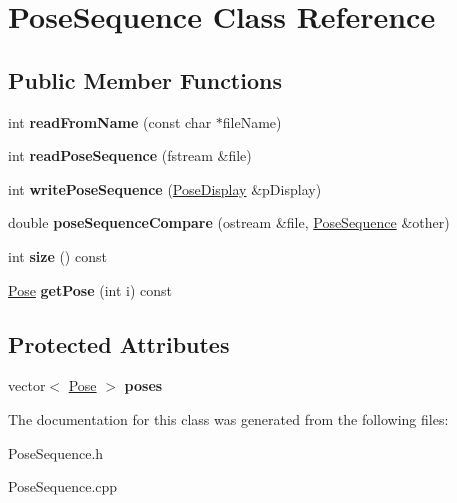 \hypertarget{classPoseSequence}{}\section{Pose\+Sequence Class Reference}
\label{classPoseSequence}
\subsection*{Public Member Functions}
\begin{DoxyCompactItemize}
\item 
\hypertarget{classPoseSequence_a86f364410d68c0fbdb44671702d691ef}{}int {\bfseries read\+From\+Name} (const char $\ast$file\+Name)\label{classPoseSequence_a86f364410d68c0fbdb44671702d691ef}

\item 
\hypertarget{classPoseSequence_a9c572d095fd38ab1eb5a366c5a5a849f}{}int {\bfseries read\+Pose\+Sequence} (fstream \&file)\label{classPoseSequence_a9c572d095fd38ab1eb5a366c5a5a849f}

\item 
\hypertarget{classPoseSequence_a9cea0db6a913505e585ffa8c9667b913}{}int {\bfseries write\+Pose\+Sequence} (\hyperlink{classPoseDisplay}{Pose\+Display} \&p\+Display)\label{classPoseSequence_a9cea0db6a913505e585ffa8c9667b913}

\item 
\hypertarget{classPoseSequence_af425c0eec2de254d105feac4efaa033b}{}double {\bfseries pose\+Sequence\+Compare} (ostream \&file, \hyperlink{classPoseSequence}{Pose\+Sequence} \&other)\label{classPoseSequence_af425c0eec2de254d105feac4efaa033b}

\item 
\hypertarget{classPoseSequence_a50daa04df4f17a1741bf689fee73561c}{}int {\bfseries size} () const \label{classPoseSequence_a50daa04df4f17a1741bf689fee73561c}

\item 
\hypertarget{classPoseSequence_a6ac72caee4b7602f3d508434963e963d}{}\hyperlink{classPose}{Pose} {\bfseries get\+Pose} (int i) const \label{classPoseSequence_a6ac72caee4b7602f3d508434963e963d}

\end{DoxyCompactItemize}
\subsection*{Protected Attributes}
\begin{DoxyCompactItemize}
\item 
\hypertarget{classPoseSequence_a0717d1235bac6edfee8b70b425fcbf98}{}vector$<$ \hyperlink{classPose}{Pose} $>$ {\bfseries poses}\label{classPoseSequence_a0717d1235bac6edfee8b70b425fcbf98}

\end{DoxyCompactItemize}


The documentation for this class was generated from the following files\+:\begin{DoxyCompactItemize}
\item 
Pose\+Sequence.\+h\item 
Pose\+Sequence.\+cpp\end{DoxyCompactItemize}
